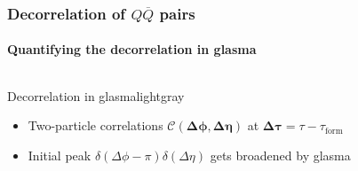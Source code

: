 \documentclass[aspectratio=169,11pt,usenames,dvipsnames]{beamer}
\begin{document}
\begin{frame}
    \frametitle{Decorrelation of $Q\overline{Q}$ pairs}
    \framesubtitle{Quantifying the decorrelation in glasma}
    \vspace{-15pt}
    \begin{center}
        \begin{columns}[onlytextwidth,t]
           \begin{center}
                \begin{custombox2}{\normalsize Decorrelation in glasma}{lightgray}
                    \small
                    \begin{varwidth}{1.02\textwidth}
                    \begin{itemize}\itemsep0em 
                        \itemsep0em
                        \footnotesize
                        \item Two-particle correlations $\boldsymbol{\mathcal{C}(\Delta\phi, \Delta\eta)}$ at $\boldsymbol{\Delta\tau}=\tau-\tau_\mathrm{form}$
                        \item Initial peak $\delta(\Delta\phi-\pi)\delta(\Delta\eta)$ gets broadened by glasma
                    \end{itemize}
                    \end{varwidth}
                \end{custombox2}
                

\end{center}
\end{columns}
\end{center}
\end{frame}
\end{document}
